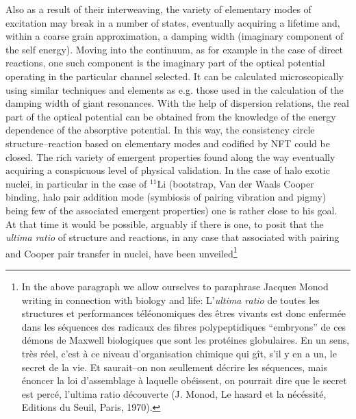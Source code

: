 \begin{subappendices}
Also as a result of their interweaving,  the variety of elementary modes of excitation may break in a number of states, eventually acquiring a lifetime and, within a coarse grain approximation, a damping width (imaginary component of the self energy). Moving into the continuum, as for example in the case of direct reactions, one such component is the imaginary part of the optical potential operating in the particular channel selected. It can be calculated microscopically using similar techniques and elements as e.g. those used in the calculation of the damping width of giant resonances. With the help of dispersion relations, the real part of the optical potential can be obtained from the knowledge of the energy dependence of the absorptive potential. In this way, the consistency circle structure--reaction based on elementary modes and codified by NFT could be closed. The rich variety of emergent properties found along the way eventually acquiring a conspicuous level of physical validation. In the case of halo exotic nuclei, in particular in the case of $^{11}$Li (bootstrap, Van der Waals Cooper binding, halo pair addition mode (symbiosis of pairing vibration and pigmy) being few of the associated emergent properties) one is rather close to his goal. At that time it would be possible, arguably if there is one, to posit that the \textit{ultima ratio} of structure and reactions, in any case that associated with pairing and Cooper pair transfer in nuclei, have been unveiled\footnote{In the above paragraph we allow ourselves to paraphrase Jacques Monod writing in connection with biology and life: L'\textit{ultima ratio} de toutes les structures et performances t\'el\'eonomiques des \^etres vivants est donc enferm\'ee dans les s\'equences des radicaux des fibres polypeptidiques ``embryons'' de ces d\'emons de Maxwell biologiques que sont les prot\'eines globulaires. En un sens, tr\`{e}s r\'{e}el, c'est \`a ce niveau d'organisation chimique qui g\^it, s'il y en a un, le secret de la vie. Et saurait--on non seullement d\'ecrire les s\'equences, mais \'enoncer la loi d'assemblage \`a laquelle ob\'eissent, on pourrait dire que le secret est perc\'e, l'ultima ratio d\'ecouverte (J. Monod, Le hasard et la n\'ec\'essit\'e, Editions du Seuil, Paris, 1970).}

\end{subappendices}
